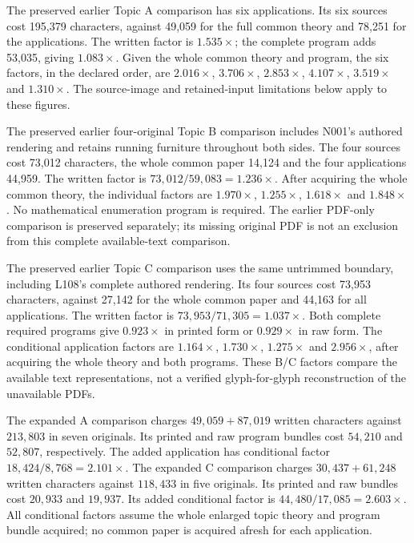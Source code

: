 \documentclass[11pt,a4paper]{article}
\begin{document}
The preserved earlier Topic A comparison has six applications. Its six sources cost
195,379 characters, against 49,059 for the full common theory and 78,251 for
the applications. The written factor is $1.535\times$; the complete program
adds 53,035, giving $1.083\times$. Given the whole common theory and program,
the six factors, in the declared order, are $2.016\times$, $3.706\times$,
$2.853\times$, $4.107\times$, $3.519\times$ and $1.310\times$.
The source-image and retained-input limitations below apply to these figures.

The preserved earlier four-original Topic B comparison includes N001's authored
rendering and retains running furniture throughout both sides. The four
sources cost 73,012 characters, the whole common paper 14,124 and the four
applications 44,959. The written factor is $73{,}012/59{,}083=1.236\times$.
After acquiring the whole common theory, the individual factors are
$1.970\times$, $1.255\times$, $1.618\times$ and $1.848\times$.
No mathematical enumeration program is required. The earlier PDF-only
comparison is preserved separately; its missing original PDF is not an
exclusion from this complete available-text comparison.

The preserved earlier Topic C comparison uses the same untrimmed boundary,
including L108's complete authored rendering. Its four sources cost 73,953 characters, against 27,142 for the
whole common paper and 44,163 for all applications. The written factor is
$73{,}953/71{,}305=1.037\times$. Both complete required programs give
$0.923\times$ in printed form or $0.929\times$ in raw form. The conditional
application factors are $1.164\times$, $1.730\times$, $1.275\times$ and
$2.956\times$, after acquiring the whole theory and both programs.
These B/C factors compare the available text representations, not a
verified glyph-for-glyph reconstruction of the unavailable PDFs.


The expanded A comparison charges $49{,}059+87{,}019$ written characters
against $213{,}803$ in seven originals. Its printed and raw program bundles
cost $54{,}210$ and $52{,}807$, respectively. The added application has
conditional factor $18{,}424/8{,}768=2.101\times$. The expanded C comparison
charges $30{,}437+61{,}248$ written characters against $118{,}433$ in five
originals. Its printed and raw bundles cost $20{,}933$ and $19{,}937$.
Its added conditional factor is $44{,}480/17{,}085=2.603\times$.
All conditional factors assume the whole enlarged topic theory and program
bundle acquired; no common paper is acquired afresh for each application.
\end{document}
